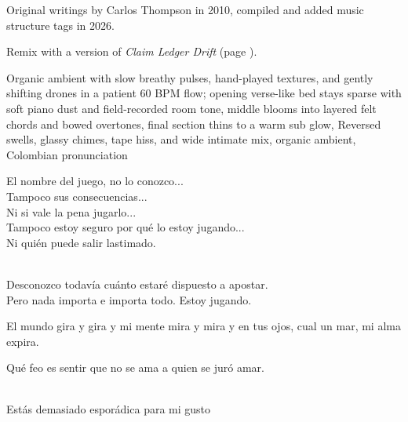 
\begin{notes}
Original writings by Carlos Thompson in 2010, compiled and added music structure tags in 2026.

Remix with a version of \emph{Claim Ledger Drift} (page \pageref{sec:claim-ledger-drift}).
\end{notes}
\begin{style}
Organic ambient with slow breathy pulses, hand-played textures, and gently shifting drones in a patient 60 BPM flow; opening verse-like bed stays sparse with soft piano dust and field-recorded room tone, middle blooms into layered felt chords and bowed overtones, final section thins to a warm sub glow, Reversed swells, glassy chimes, tape hiss, and wide intimate mix, organic ambient, Colombian pronunciation
\end{style}
\begin{lyrics}
El nombre del juego, no lo conozco...\\
Tampoco sus consecuencias...\\
Ni si vale la pena jugarlo...\\
Tampoco estoy seguro por qué lo estoy jugando...\\
Ni quién puede salir lastimado.

\\
Desconozco todavía cuánto estaré dispuesto a apostar.\\
Pero nada importa e importa todo.  Estoy jugando.

El mundo gira y gira y mi mente mira y mira y en tus ojos, cual un mar, mi alma expira.

Qué feo es sentir que no se ama a quien se juró amar.

\\
Estás demasiado esporádica para mi gusto
\end{lyrics}
